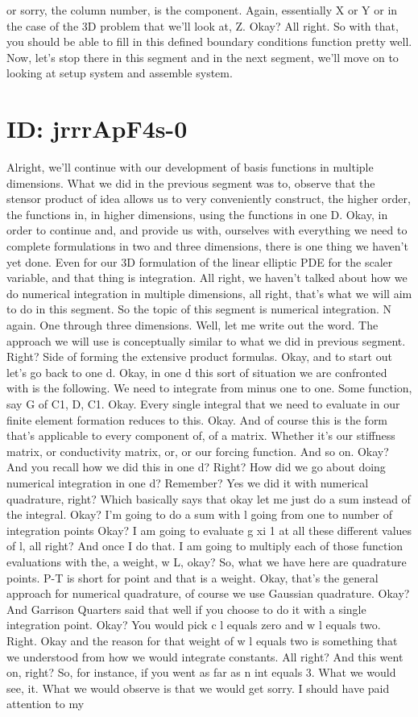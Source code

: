 \documentclass[10pt]{article}
\begin{document}
or sorry, the column number, is the component. Again, essentially X or Y or in the case of the 3D problem that we'll look at, Z. Okay? All right. So with that, you should be able to fill in this defined boundary conditions function pretty well. Now, let's stop there in this segment and in the next segment, we'll move on to looking at setup system and assemble system.

\section*{ID: jrrrApF4s-0}
Alright, we'll continue with our development of basis functions in multiple dimensions. What we did in the previous segment was to, observe that the stensor product of idea allows us to very conveniently construct, the higher order, the functions in, in higher dimensions, using the functions in one D. Okay, in order to continue and, and provide us with, ourselves with everything we need to complete formulations in two and three dimensions, there is one thing we haven't yet done. Even for our 3D formulation of the linear elliptic PDE for the scaler variable, and that thing is integration. All right, we haven't talked about how we do numerical integration in multiple dimensions, all right, that's what we will aim to do in this segment. So the topic of this segment is numerical integration. N again. One through three dimensions. Well, let me write out the word. The approach we will use is conceptually similar to what we did in previous segment. Right? Side of forming the extensive product formulas. Okay, and to start out let's go back to one d. Okay, in one d this sort of situation we are confronted with is the following. We need to integrate from minus one to one. Some function, say G of C1, D, C1. Okay. Every single integral that we need to evaluate in our finite element formation reduces to this. Okay. And of course this is the form that's applicable to every component of, of a matrix. Whether it's our stiffness matrix, or conductivity matrix, or, or our forcing function. And so on. Okay? And you recall how we did this in one d? Right? How did we go about doing numerical integration in one d? Remember? Yes we did it with numerical quadrature, right? Which basically says that okay let me just do a sum instead of the integral. Okay? I'm going to do a sum with l going from one to number of integration points Okay? I am going to evaluate g xi 1 at all these different values of l, all right? And once I do that. I am going to multiply each of those function evaluations with the, a weight, w L, okay? So, what we have here are quadrature points. P-T is short for point and that is a weight. Okay, that's the general approach for numerical quadrature, of course we use Gaussian quadrature. Okay? And Garrison Quarters said that well if you choose to do it with a single integration point. Okay? You would pick c l equals zero and w l equals two. Right. Okay and the reason for that weight of w l equals two is something that we understood from how we would integrate constants. All right? And this went on, right? So, for instance, if you went as far as n int equals 3. What we would see, it. What we would observe is that we would get sorry. I should have paid attention to my 
\end{document}
